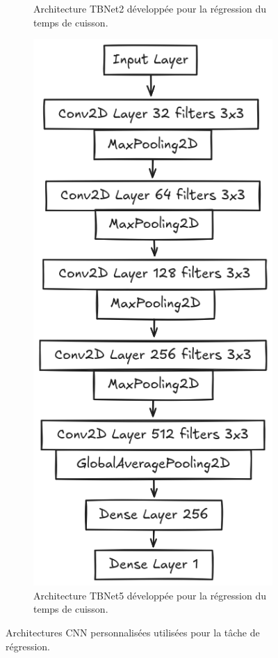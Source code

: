 \begin{figure}[H]
\begin{subfigure}[t]{0.45\linewidth}
        \caption{Architecture TBNet2 développée pour la régression du temps de cuisson.}
        \label{fig:tbnet2}
    \end{subfigure}%
    \hfill
    \begin{subfigure}[t]{0.45\linewidth}
        \centering
        \includegraphics[width=0.8\linewidth]{figures/tbnet5.png}
        \caption{Architecture TBNet5 développée pour la régression du temps de cuisson.}
        \label{fig:tbnet5}
    \end{subfigure}
    \caption{Architectures CNN personnalisées utilisées pour la tâche de régression.}
    \label{fig:tbnet}
\end{figure}


